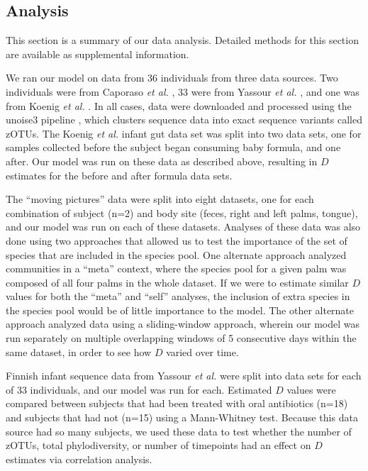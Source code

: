 \documentclass{article}
\begin{document}
\subsection{Analysis} \label{sec:analysis}
This section is a summary of our data analysis. Detailed methods for this section are available as supplemental information.
\par
We ran our model on data from 36 individuals from three data sources. Two individuals were from Caporaso \emph{et al.} \cite{Caporaso2011}, 33 were from Yassour \emph{et al.} \cite{Yassour2016}, and one was from Koenig \emph{et al.} \cite{Koenig2011}. In all cases, data were downloaded and processed using the unoise3 pipeline \cite{Edgar2016}, which clusters sequence data into exact sequence variants called zOTUs. The Koenig \emph{et al.} infant gut data set was split into two data sets, one for samples collected before the subject began consuming baby formula, and one after. Our model was run on these data as described above, resulting in \(D\) estimates for the before and after formula data sets. 
\par
The “moving pictures” \cite{Caporaso2011} data were split into eight datasets, one for each combination of subject (n=2) and body site (feces, right and left palms, tongue), and our model was run on each of these datasets. Analyses of these data was also done using two approaches that allowed us to test the importance of the set of species that are included in the species pool. One alternate approach analyzed communities in a “meta” context, where the species pool for a given palm was composed of all four palms in the whole dataset. If we were to estimate similar \(D\) values for both the “meta” and “self” analyses, the inclusion of extra species in the species pool would be of little importance to the model. The other alternate approach analyzed data using a sliding-window approach, wherein our model was run separately on multiple overlapping windows of 5 consecutive days within the same dataset, in order to see how \(D\) varied over time. 
\par
Finnish infant sequence data from Yassour \emph{et al.} \cite{Yassour2016} were split into data sets for each of 33 individuals, and our model was run for each. Estimated \(D\) values were compared between subjects that had been treated with oral antibiotics (n=18) and subjects that had not (n=15) using a Mann-Whitney test. Because this data source had so many subjects, we used these data to test whether the number of zOTUs, total phylodiversity, or number of timepoints had an effect on \(D\) estimates via correlation analysis. 
\end{document}
